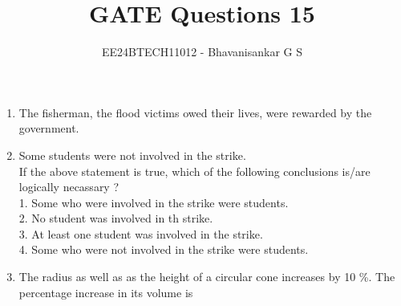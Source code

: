 \documentclass[journal]{IEEEtran}
\begin{document}

\vspace{3cm}

\title{GATE Questions 15}
\author{EE24BTECH11012 - Bhavanisankar G S}
{\let\newpage\relax\maketitle}
\begin{enumerate}
	\item The fisherman, \underline{			} the flood victims owed their lives, were rewarded by the government.
		\begin{enumerate}
		\end{enumerate}
	\item Some students were not involved in the strike. \\
		If the above statement is true, which of the following conclusions is/are logically necassary ? \\
		1. Some who were involved in the strike were students. \\
		2. No student was involved in th strike. \\
		3. At least one student was involved in the strike. \\
		4. Some who were not involved in the strike were students.
		\begin{enumerate}
				\begin{multicols}{2}
				\item 1 and 2
				\item 3
				\item 4
				\item 2 and 3
				\end{multicols}
		\end{enumerate}
	\item The radius as well as as the height of a circular cone increases by 10 \%. The percentage increase in its volume is
		\begin{enumerate}
				\begin{multicols}{4}

\end{multicols}
\end{enumerate}
\end{enumerate}
\end{document}
